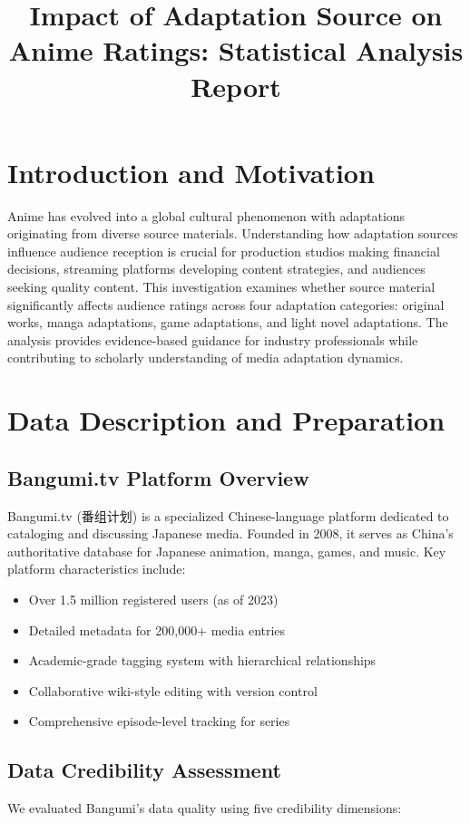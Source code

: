\documentclass{article}
\title{Impact of Adaptation Source on Anime Ratings: Statistical Analysis Report}
\author{}
\date{}
\begin{document}
\maketitle

\section{Introduction and Motivation}
Anime has evolved into a global cultural phenomenon with adaptations originating from diverse source materials. Understanding how adaptation sources influence audience reception is crucial for production studios making financial decisions, streaming platforms developing content strategies, and audiences seeking quality content. This investigation examines whether source material significantly affects audience ratings across four adaptation categories: original works, manga adaptations, game adaptations, and light novel adaptations. The analysis provides evidence-based guidance for industry professionals while contributing to scholarly understanding of media adaptation dynamics.

\section{Data Description and Preparation}

\subsection{Bangumi.tv Platform Overview}
Bangumi.tv (番组计划) is a specialized Chinese-language platform dedicated to cataloging and discussing Japanese media. Founded in 2008, it serves as China's authoritative database for Japanese animation, manga, games, and music. Key platform characteristics include:

\begin{itemize}
    \item Over 1.5 million registered users (as of 2023)
    \item Detailed metadata for 200,000+ media entries
    \item Academic-grade tagging system with hierarchical relationships
    \item Collaborative wiki-style editing with version control
    \item Comprehensive episode-level tracking for series
\end{itemize}

\subsection{Data Credibility Assessment}
We evaluated Bangumi's data quality using five credibility dimensions:
\end{document}
